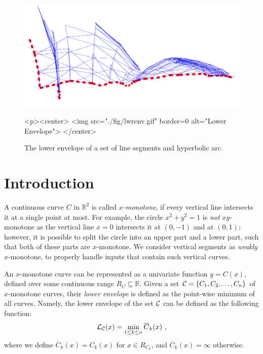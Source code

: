 

\begin{figure}[!htp]
\begin{center}
\begin{ccTexOnly}
  \includegraphics[width=5in]{Envelope_2/fig/lwrenv}
\end{ccTexOnly}
\label{fig:teaser}
\begin{ccHtmlOnly}
  <p><center>
    <img src="./fig/lwrenv.gif" border=0 alt="Lower Envelope">
  </center>
\end{ccHtmlOnly}
\caption{The lower envelope of a set of line segments and hyperbolic
arc.} 
\end{center}
\end{figure}

\section{Introduction}

A continuous curve $C$ in ${\mathbb R}^2$ is called {\em $x$-monotone}, if
every vertical line intersects it at a single point at most. For
example, the circle $x^2 + y^2 = 1$ is {\em not} $xy$-monotone as the
vertical line $x = 0$ intersects it at $(0, -1)$ and at $(0, 1)$;
however, it is possible to split the circle into an upper part and a
lower part, such that both of these parts are $x$-monotone.
We consider vertical segments as {\em weakly} $x$-monotone, to properly
handle inputs that contain such vertical curves.

An $x$-monotone curve can be represented as a univariate function
$y = C(x)$, defined over some continuous range $R_C \subseteq {\mathbb R}$.
Given a set ${\cal C} = \{ C_1, C_2, \ldots, C_n \}$ of $x$-monotone
curves, their {\em lower envelope} is defined as the point-wise minimum of
all curves. Namely, the lower envelope of the set ${\cal C}$ can be
defined as the following function:
\begin{eqnarray*}
{\cal L}_{{\cal C}} (x) = \min_{1 \leq k \leq n}{\overline{C}_k (x)} \ ,
\end{eqnarray*}
where we define $\overline{C}_k(x) = C_k(x)$ for $x \in R_{C_k}$,
and $\overline{C}_k(x) = \infty$ otherwise.

